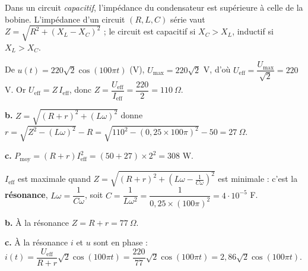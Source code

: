 \documentclass[11pt]{article}
\begin{document}
Dans un circuit \emph{capacitif}, l'impédance du condensateur est supérieure à celle de la bobine. L'impédance d'un circuit $(R, L, C)$ série vaut $Z = \sqrt{R^2 + (X_L - X_C)^2}$ ; le circuit est capacitif si $X_C > X_L$, inductif si $X_L > X_C$.
\begin{center}
\end{center}


 De $u(t) = 220\sqrt{2}\cos(100\pi t)$ (V), $U_{\max} = 220\sqrt{2}$ V, d'où $U_{\text{eff}} = \dfrac{U_{\max}}{\sqrt{2}} = 220$ V. Or $U_{\text{eff}} = Z\,I_{\text{eff}}$, donc $Z = \dfrac{U_{\text{eff}}}{I_{\text{eff}}} = \dfrac{220}{2} = 110\ \Omega$.

\textbf{b.} $Z = \sqrt{(R + r)^2 + (L\omega)^2}$ donne $r = \sqrt{Z^2 - (L\omega)^2} - R = \sqrt{110^2 - (0{,}25\times 100\pi)^2} - 50 = 27\ \Omega$.

\textbf{c.} $P_{\text{moy}} = (R + r)I_{\text{eff}}^2 = (50 + 27)\times 2^2 = 308$ W.

 $I_{\text{eff}}$ est maximale quand $Z = \sqrt{(R+r)^2 + (L\omega - \frac{1}{C\omega})^2}$ est minimale : c'est la \textbf{résonance}, $L\omega = \dfrac{1}{C\omega}$, soit $C = \dfrac{1}{L\omega^2} = \dfrac{1}{0{,}25\times(100\pi)^2} = 4\cdot10^{-5}$ F.

\textbf{b.} À la résonance $Z = R + r = 77\ \Omega$.

\textbf{c.} À la résonance $i$ et $u$ sont en phase : $i(t) = \dfrac{U_{\text{eff}}}{R+r}\sqrt{2}\cos(100\pi t) = \dfrac{220}{77}\sqrt{2}\cos(100\pi t) = 2{,}86\sqrt{2}\cos(100\pi t)$.
\end{document}
